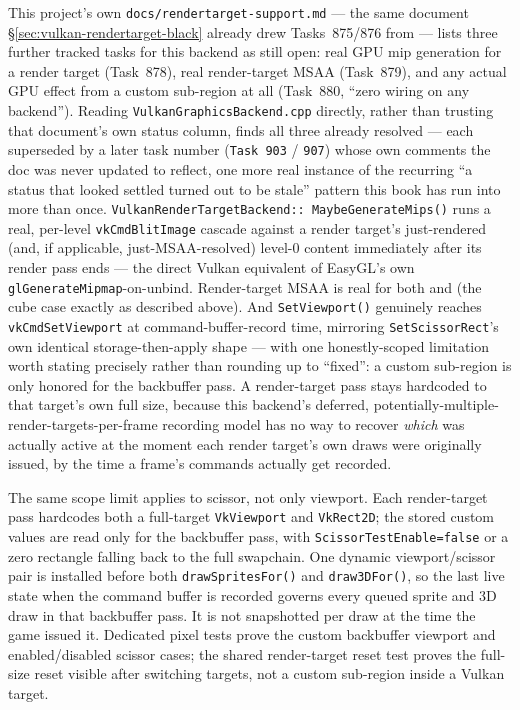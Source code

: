 This project's own \texttt{docs/rendertarget-support.md} --- the same document
\S\ref{sec:vulkan-rendertarget-black} already drew Tasks~875/876 from --- lists three further
tracked tasks for this backend as still open: real GPU mip generation for a render target
(Task~878), real render-target MSAA (Task~879), and any actual GPU effect from a custom
sub-region  at all (Task~880, ``zero wiring on any backend''). Reading
\texttt{VulkanGraphicsBackend.cpp} directly, rather than trusting that document's own status
column, finds all three already resolved --- each superseded by a later task number
(\texttt{Task~903} / \texttt{907}) whose own comments the doc was never updated to reflect, one
more real instance of the recurring ``a status that looked settled turned out to be stale''
pattern this book has run into more than once. \texttt{VulkanRenderTargetBackend::%
MaybeGenerateMips()} runs a real, per-level \texttt{vkCmdBlitImage} cascade against a render
target's just-rendered (and, if applicable, just-MSAA-resolved) level-0 content immediately
after its render pass ends --- the direct Vulkan equivalent of EasyGL's own
\texttt{glGenerateMipmap}-on-unbind. Render-target MSAA is real for both
 and  (the cube case exactly as described
above). And \texttt{SetViewport()} genuinely reaches \texttt{vkCmdSetViewport} at
command-buffer-record time, mirroring \texttt{SetScissorRect}'s own identical storage-then-apply
shape --- with one honestly-scoped limitation worth stating precisely rather than rounding up to
``fixed'': a custom sub-region  is only honored for the backbuffer pass. A
render-target pass stays hardcoded to that target's own full size, because this backend's
deferred, potentially-multiple-render-targets-per-frame recording model has no way to recover
\emph{which}  was actually active at the moment each render target's own draws
were originally issued, by the time a frame's commands actually get recorded.

The same scope limit applies to scissor, not only viewport. Each render-target pass hardcodes
both a full-target \texttt{VkViewport} and \texttt{VkRect2D}; the stored custom values are read
only for the backbuffer pass, with \texttt{ScissorTestEnable=false} or a zero rectangle falling
back to the full swapchain. One dynamic viewport/scissor pair is installed before both
\texttt{drawSpritesFor()} and \texttt{draw3DFor()}, so the last live state when the command
buffer is recorded governs every queued sprite and 3D draw in that backbuffer pass. It is not
snapshotted per draw at the time the game issued it. Dedicated pixel tests prove the custom
backbuffer viewport and enabled/disabled scissor cases; the shared render-target reset test
proves the full-size reset visible after switching targets, not a custom sub-region inside a
Vulkan target.

